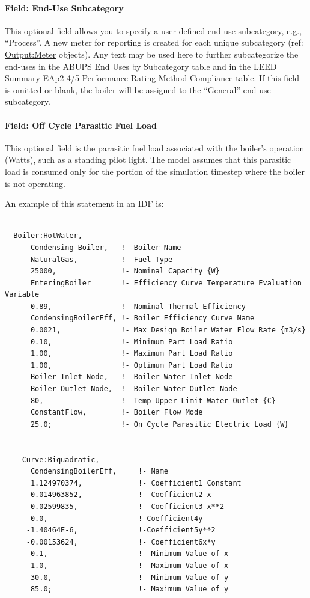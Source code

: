 \paragraph{Field: End-Use Subcategory}\label{end-use-subcategory-10}

This optional field allows you to specify a user-defined end-use subcategory, e.g., ``Process''. A new meter for reporting is created for each unique subcategory (ref: \hyperref[outputmeter-and-outputmetermeterfileonly]{Output:Meter} objects). Any text may be used here to further subcategorize the end-uses in the ABUPS End Uses by Subcategory table and in the LEED Summary EAp2-4/5 Performance Rating Method Compliance table. If this field is omitted or blank, the boiler will be assigned to the ``General'' end-use subcategory.

\paragraph{Field: Off Cycle Parasitic Fuel Load}\label{field-boiler-parasitic-fuel-load}

This optional field is the parasitic fuel load associated with the boiler's operation (Watts), such as a standing pilot light. The model assumes that this parasitic load is consumed only for the portion of the simulation timestep where the boiler is not operating.

An example of this statement in an IDF is:

\begin{lstlisting}

  Boiler:HotWater,
      Condensing Boiler,   !- Boiler Name
      NaturalGas,          !- Fuel Type
      25000,               !- Nominal Capacity {W}
      EnteringBoiler       !- Efficiency Curve Temperature Evaluation Variable
      0.89,                !- Nominal Thermal Efficiency
      CondensingBoilerEff, !- Boiler Efficiency Curve Name
      0.0021,              !- Max Design Boiler Water Flow Rate {m3/s}
      0.10,                !- Minimum Part Load Ratio
      1.00,                !- Maximum Part Load Ratio
      1.00,                !- Optimum Part Load Ratio
      Boiler Inlet Node,   !- Boiler Water Inlet Node
      Boiler Outlet Node,  !- Boiler Water Outlet Node
      80,                  !- Temp Upper Limit Water Outlet {C}
      ConstantFlow,        !- Boiler Flow Mode
      25.0;                !- On Cycle Parasitic Electric Load {W}


    Curve:Biquadratic,
      CondensingBoilerEff,     !- Name
      1.124970374,             !- Coefficient1 Constant
      0.014963852,             !- Coefficient2 x
     -0.02599835,              !- Coefficient3 x**2
      0.0,                     !-Coefficient4y
     -1.40464E-6,              !-Coefficient5y**2
     -0.00153624,              !- Coefficient6x*y
      0.1,                     !- Minimum Value of x
      1.0,                     !- Maximum Value of x
      30.0,                    !- Minimum Value of y
      85.0;                    !- Maximum Value of y
\end{lstlisting}

